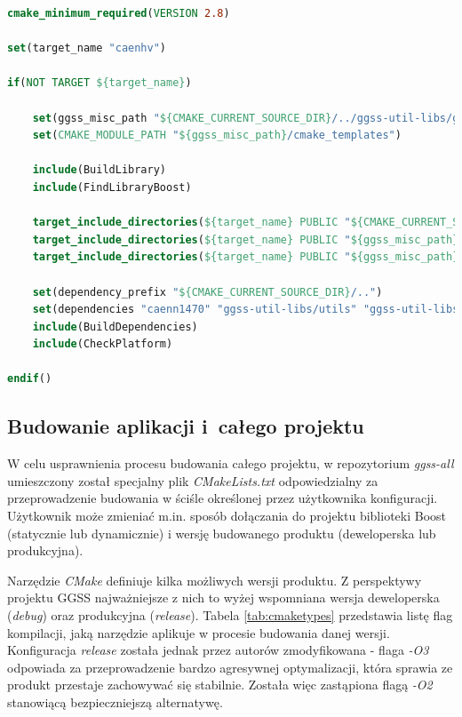\begin{lstlisting}[language=cmake, caption={Plik \textit{CMakeLists.txt} służący do budowania biblioteki \textit{caenhv}. Widoczne zastosowanie m.in. plików \textit{BuildLibrary.cmake} oraz \textit{BuildDependencies.cmake}.},label={lst:caenhvcmake}]
cmake_minimum_required(VERSION 2.8)

set(target_name "caenhv")

if(NOT TARGET ${target_name})
   
    set(ggss_misc_path "${CMAKE_CURRENT_SOURCE_DIR}/../ggss-util-libs/ggss-misc")
    set(CMAKE_MODULE_PATH "${ggss_misc_path}/cmake_templates")

    include(BuildLibrary)
    include(FindLibraryBoost)

    target_include_directories(${target_name} PUBLIC "${CMAKE_CURRENT_SOURCE_DIR}/include/CaenHVLib")
    target_include_directories(${target_name} PUBLIC "${ggss_misc_path}/include")
    target_include_directories(${target_name} PUBLIC "${ggss_misc_path}")

    set(dependency_prefix "${CMAKE_CURRENT_SOURCE_DIR}/..")
    set(dependencies "caenn1470" "ggss-util-libs/utils" "ggss-util-libs/thread")
    include(BuildDependencies)
    include(CheckPlatform)

endif()
\end{lstlisting}



\subsection{Budowanie aplikacji i~całego projektu} 
W celu usprawnienia procesu budowania całego projektu, w repozytorium \textit{ggss-all} umieszczony został specjalny plik \textit{CMakeLists.txt} odpowiedzialny za przeprowadzenie budowania w ściśle określonej przez użytkownika konfiguracji. Użytkownik może zmieniać m.in. sposób dołączania do projektu biblioteki Boost (statycznie lub dynamicznie) i wersję budowanego produktu (deweloperska lub produkcyjna). 

Narzędzie \textit{CMake} definiuje kilka możliwych wersji produktu. Z perspektywy projektu GGSS najważniejsze z nich to wyżej wspomniana wersja deweloperska (\textit{debug}) oraz produkcyjna (\textit{release}). Tabela \ref{tab:cmaketypes} przedstawia listę flag kompilacji, jaką narzędzie aplikuje w procesie budowania danej wersji. Konfiguracja \textit{release} została jednak przez autorów zmodyfikowana - flaga \textit{-O3} odpowiada za przeprowadzenie bardzo agresywnej optymalizacji, która sprawia ze produkt przestaje zachowywać się stabilnie. Została więc zastąpiona flagą \textit{-O2} stanowiącą bezpieczniejszą alternatywę. 

